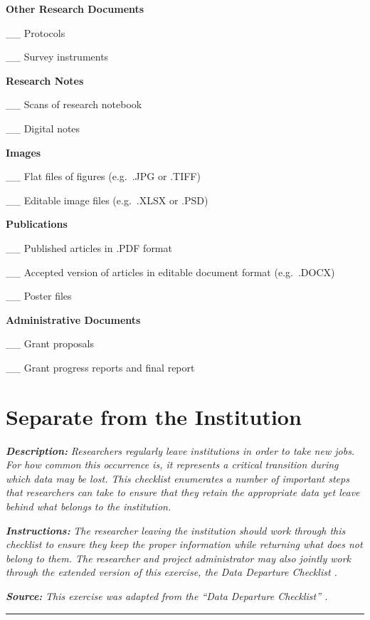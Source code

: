 \documentclass[
]{book}
\begin{document}
\textbf{Other Research Documents}

\_\_ Protocols

\_\_ Survey instruments

\textbf{Research Notes}

\_\_ Scans of research notebook

\_\_ Digital notes

\textbf{Images}

\_\_ Flat files of figures (e.g.~.JPG or .TIFF)

\_\_ Editable image files (e.g.~.XLSX or .PSD)

\textbf{Publications}

\_\_ Published articles in .PDF format

\_\_ Accepted version of articles in editable document format (e.g.~.DOCX)

\_\_ Poster files

\textbf{Administrative Documents}

\_\_ Grant proposals

\_\_ Grant progress reports and final report

\hypertarget{separation}{%
\section{Separate from the Institution}\label{separation}}

\textbf{\emph{Description:}} \emph{Researchers regularly leave institutions in order to take new jobs. For how common this occurrence is, it represents a critical transition during which data may be lost. This checklist enumerates a number of important steps that researchers can take to ensure that they retain the appropriate data yet leave behind what belongs to the institution.}

\textbf{\emph{Instructions:}} \emph{The researcher leaving the institution should work through this checklist to ensure they keep the proper information while returning what does not belong to them. The researcher and project administrator may also jointly work through the extended version of this exercise, the Data Departure Checklist \citep{goben_data_2023}.}

\textbf{\emph{Source:}} \emph{This exercise was adapted from the ``Data Departure Checklist'' \citep{goben_data_2023}.}

\begin{center}\rule{0.5\linewidth}{0.5pt}\end{center}
\end{document}
